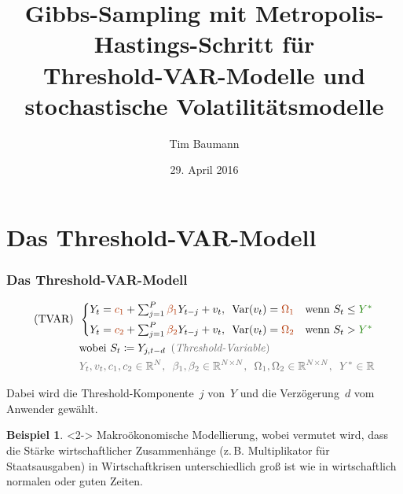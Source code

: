 \documentclass[10pt]{beamer}
\title{Gibbs-Sampling mit Metropolis-Hastings-Schritt für \\ Threshold-VAR-Modelle und \\ stochastische Volatilitätsmodelle}
\institute{\href{http://timbaumann.info/gibbs-her}{timbaumann.info/gibbs-her}}
\author{Tim Baumann}
\date{29. April 2016}
\theoremstyle{definition}
\newtheorem*{bsp}{Beispiel}
\newcommand{\R}{\mathbb{R}} %
\DeclareMathOperator{\var}{Var} %
\newcommand{\stepOne}[1]{\textcolor{StepOneColor}{#1}}
\newcommand{\stepTwo}[1]{\textcolor{StepTwoColor}{#1}}
\newcommand{\typeInfo}[1]{\textcolor{TypeInfoColor}{#1}}
\begin{document}
\begin{frame}
  \titlepage
\end{frame}

\begin{frame}
  \tableofcontents
\end{frame}


\section[Threshold-VAR-Modell]{Das Threshold-VAR-Modell}

\begin{frame}[t]
  \frametitle{Das Threshold-VAR-Modell}

  \begin{modelbox}
    \begin{align*}
      \text{(TVAR)} \enspace
      & \begin{cases}
        Y_t = \stepOne{c_1} + \sum_{j=1}^P \stepOne{\beta_1} Y_{t-j} + v_t, \enspace
        \var(v_t) = \stepOne{\Omega_1}
        & \text{wenn } S_t \leq \stepTwo{Y^*} \\[4pt]
        Y_t = \stepOne{c_2} + \sum_{j=1}^P \stepOne{\beta_2} Y_{t-j} + v_t, \enspace
        \var(v_t) = \stepOne{\Omega_2}
        & \text{wenn } S_t > \stepTwo{Y^*}
      \end{cases} \\
      & \text{wobei } S_t \coloneqq Y_{j, t-d} \enspace \text{\typeInfo{(\emph{Threshold-Variable})}} \\
      & \typeInfo{
        Y_t, v_t, c_1, c_2 \in \R^N, \enspace
        \beta_1, \beta_2 \in \R^{N \times N}, \enspace
        \Omega_1, \Omega_2 \in \R^{N \times N}, \enspace
        Y^* \in \R
      }
    \end{align*}
  \end{modelbox}

  Dabei wird die Threshold-Komponente~$j$ von~$Y$ und die Verzögerung~$d$ vom Anwender gewählt.

  \begin{bsp}<2->
    Makroökonomische Modellierung, wobei vermutet wird, dass die Stärke wirtschaftlicher Zusammenhänge (z.\,B. Multiplikator für Staatsausgaben) in Wirtschaftkrisen unterschiedlich groß ist wie in wirtschaftlich normalen oder guten Zeiten.
  \end{bsp}
\end{frame}
\end{document}
